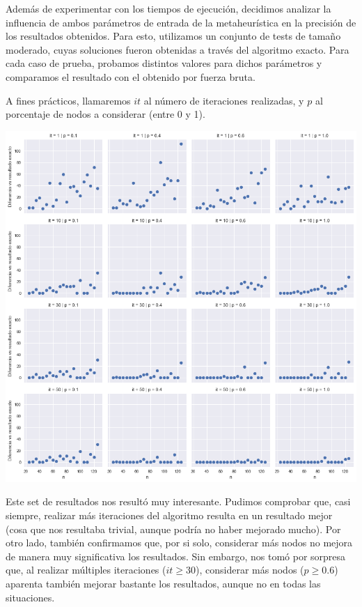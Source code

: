 Además de experimentar con los tiempos de ejecución, decidimos analizar la influencia de ambos parámetros de entrada de la metaheurística en la precisión de los resultados obtenidos. Para esto, utilizamos un conjunto de tests de tamaño moderado, cuyas soluciones fueron obtenidas a través del algoritmo exacto. Para cada caso de prueba, probamos distintos valores para dichos parámetros y comparamos el resultado con el obtenido por fuerza bruta.

A fines prácticos, llamaremos $it$ al número de iteraciones realizadas, y $p$ al porcentaje de nodos a considerar (entre 0 y 1).

\begin{center}
    \includegraphics[scale=0.6]{img/grasp-4x4.png}
\end{center}

Este set de resultados nos resultó muy interesante. Pudimos comprobar que, casi siempre, realizar más iteraciones del algoritmo resulta en un resultado mejor (cosa que nos resultaba trivial, aunque podría no haber mejorado mucho). Por otro lado, también confirmamos que, por si solo, considerar más nodos no mejora de manera muy significativa los resultados. Sin embargo, nos tomó por sorpresa que, al realizar múltiples iteraciones ($it \geq 30$), considerar más nodos ($p \geq 0.6$) aparenta también mejorar bastante los resultados, aunque no en todas las situaciones.
 
